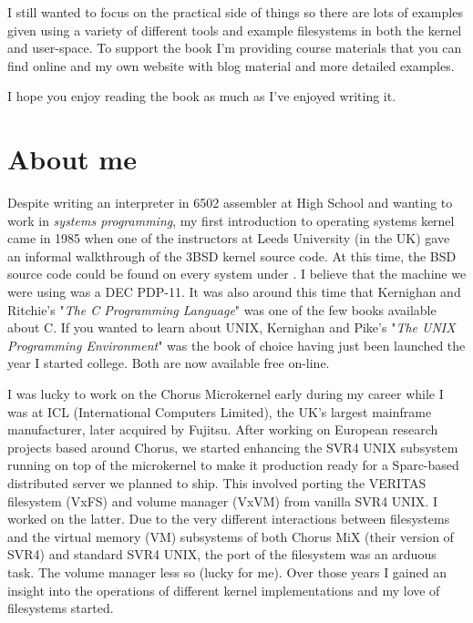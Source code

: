 I still wanted to focus on the practical side of things so there are lots of examples given using a variety of different tools and example filesystems in both the kernel and user-space. To support the book I'm providing course materials that you can find online and my own website with blog material and more detailed examples.

I hope you enjoy reading the book as much as I've enjoyed writing it.


\section{About me}

Despite writing an interpreter in 6502 assembler at High School and wanting to work in \textit{systems programming}, my first introduction to operating systems kernel came in 1985 when one of the instructors at Leeds University (in the UK) gave an informal walkthrough of the 3BSD kernel source code. At this time, the BSD source code could be found on every system under . I believe that the machine we were using was a DEC PDP-11. It was also around this time that Kernighan and Ritchie’s "\textit{The C Programming Language}" \cite{kernighan} was one of the few books available about C. If you wanted to learn about UNIX, Kernighan and Pike’s "\textit{The UNIX Programming Environment}" \cite{pike} was the book of choice having just been launched the year I started college. Both are now available free on-line.

I was lucky to work on the Chorus Microkernel early during my career while I was at ICL (International Computers Limited), the UK’s largest mainframe manufacturer, later acquired by Fujitsu. After working on European research projects based around Chorus, we started enhancing the SVR4 UNIX subsystem running on top of the microkernel to make it production ready for a Sparc-based distributed server we planned to ship. This involved porting the VERITAS filesystem (VxFS) and volume manager (VxVM) from vanilla SVR4 UNIX. I worked on the latter. Due to the very different interactions between filesystems and the virtual memory (VM) subsystems of both Chorus MiX (their version of SVR4) and standard SVR4 UNIX, the port of the filesystem was an arduous task. The volume manager less so (lucky for me). Over those years I gained an insight into the operations of different kernel implementations and my love of filesystems started. 

